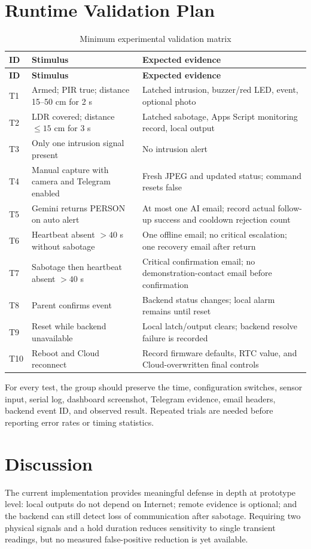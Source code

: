 \documentclass[11pt,a4paper]{report}
\begin{document}
\section{Runtime Validation Plan}
\begin{longtable}{p{1.2cm}p{5.7cm}p{7.1cm}}
\caption{Minimum experimental validation matrix}\\
\toprule
\textbf{ID} & \textbf{Stimulus} & \textbf{Expected evidence}\\
\midrule
\endfirsthead
\toprule
\textbf{ID} & \textbf{Stimulus} & \textbf{Expected evidence}\\
\midrule
\endhead
T1 & Armed; PIR true; distance 15--50 cm for 2 s & Latched intrusion,
buzzer/red LED, event, optional photo\\
T2 & LDR covered; distance $\leq15$ cm for 3 s & Latched sabotage,
Apps Script monitoring record, local output\\
T3 & Only one intrusion signal present & No intrusion alert\\
T4 & Manual capture with camera and Telegram enabled & Fresh JPEG and
updated status; command resets false\\
T5 & Gemini returns PERSON on auto alert & At most one AI email; record
actual follow-up success and cooldown rejection count\\
T6 & Heartbeat absent $>40$ s without sabotage & One offline email; no
critical escalation; one recovery email after return\\
T7 & Sabotage then heartbeat absent $>40$ s & Critical confirmation email;
no demonstration-contact email before confirmation\\
T8 & Parent confirms event & Backend status changes; local alarm remains
until reset\\
T9 & Reset while backend unavailable & Local latch/output clears; backend
resolve failure is recorded\\
T10 & Reboot and Cloud reconnect & Record firmware defaults, RTC value, and
Cloud-overwritten final controls\\
\bottomrule
\end{longtable}

For every test, the group should preserve the time, configuration switches,
sensor input, serial log, dashboard screenshot, Telegram evidence, email
headers, backend event ID, and observed result. Repeated trials are needed
before reporting error rates or timing statistics.

\section{Discussion}
The current implementation provides meaningful defense in depth at prototype
level: local outputs do not depend on Internet; remote evidence is optional;
and the backend can still detect loss of communication after sabotage.
Requiring two physical signals and a hold duration reduces sensitivity to
single transient readings, but no measured false-positive reduction is yet
available.
\end{document}
